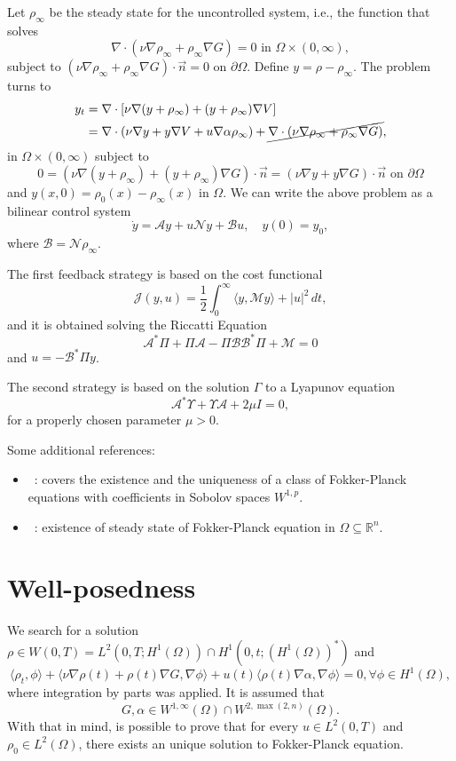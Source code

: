 \documentclass[12pt]{article}
\newcommand{\R}{\mathbb{R}}
\newcommand{\n}{\vec{n}}
\newcommand{\steady}{\rho_{\infty}}
\newcommand{\inner}[2]{\langle{} #1, #2 \rangle{}}
\theoremstyle{definition}
\begin{document}
Let $\steady$ be the steady state for the uncontrolled system, i.e., the function that solves 
\[
\nabla \cdot (\nu \nabla \steady + \steady \nabla G) = 0 \text{ in } \Omega \times (0,\infty),
\]
subject to $(\nu \nabla \steady + \steady \nabla G) \cdot \n = 0$ on $\partial \Omega$.
Define $y = \rho - \steady$.
The problem turns to 
\[
\begin{split}
    y_t &= \nabla \cdot \left[\nu \nabla (y + \steady) + (y + \steady) \nabla V\right] \\
    &= \nabla \cdot \left(\nu \nabla y + y \nabla V + u\nabla \alpha \steady\right) + \cancel{\nabla \cdot (\nu \nabla \steady + \steady \nabla G)},
\end{split}
\]
in $\Omega \times (0,\infty)$ subject to 
\[
0 = (\nu \nabla (y + \steady) + (y + \steady)\nabla G) \cdot \n = (\nu \nabla y + y\nabla G) \cdot \n \text{ on } \partial \Omega 
\]
and $y(x,0) = \rho_0(x) - \steady(x)$ in $\Omega$.
We can write the above problem as a bilinear control system 
\[
\dot{y} = \mathcal{A} y + u\mathcal{N}y + \mathcal{B} u, \quad y(0) = y_0,
\]
where $\mathcal{B} = \mathcal{N} \steady$.

The first feedback strategy is based on the cost functional 
\[
\mathcal{J}(y, u) = \frac{1}{2}\int_0^{\infty} \langle y, \mathcal{M} y \rangle + |u|^2 \, dt,    
\]
and it is obtained solving the Riccatti Equation
\[
\mathcal{A}^*\Pi + \Pi\mathcal{A} - \Pi\mathcal{B}\mathcal{B}^*\Pi + \mathcal{M} = 0
\]
and $u = -\mathcal{B}^{*}\Pi y$.

The second strategy is based on the solution $\Gamma$ to a Lyapunov equation
\[
\mathcal{A}^* \Upsilon + \Upsilon \mathcal{A} + 2 \mu I = 0,   
\]
for a properly chosen parameter $\mu > 0$.

Some additional references:

\begin{itemize}
    \item~\cite{bris2008existence}: covers the existence and the uniqueness of a class of Fokker-Planck equations with coefficients in Sobolov spaces $W^{1,p}$.
    \item~\cite{huang2015steady}: existence of steady state of Fokker-Planck equation in $\Omega \subseteq \R^n$.
\end{itemize}

\section{Well-posedness}

We search for a solution $\rho \in W(0,T) = L^2(0,T; H^1(\Omega)) \cap H^1(0, t; {(H^1(\Omega))}^*)$ and 
\[
\inner{\rho_t}{\phi} + \inner{\nu\nabla \rho(t) + \rho(t)\nabla G}{\nabla \phi} + u(t)\inner{\rho(t)\nabla \alpha}{\nabla \phi} = 0, \forall \phi \in H^1(\Omega),
\]
where integration by parts was applied.
It is assumed that 
\[
G, \alpha \in W^{1,\infty}(\Omega) \cap W^{2,\max(2,n)}(\Omega).
\]
With that in mind, is possible to prove that for every $u \in L^2(0,T)$ and $\rho_0 \in L^2(\Omega)$, there exists an unique solution to Fokker-Planck equation.
\end{document}
